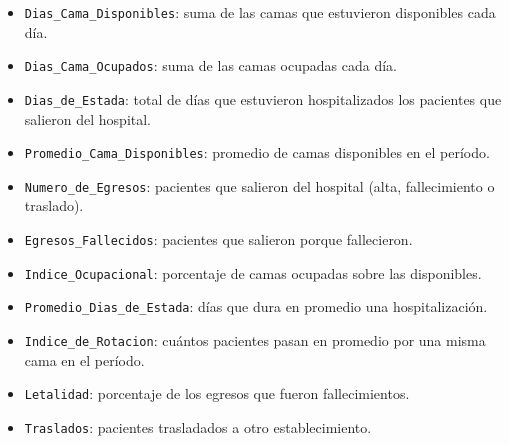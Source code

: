 \documentclass[10.5pt]{article}
\begin{document}
\begin{formulabox}
\begin{itemize}[leftmargin=1.1em,itemsep=2pt,topsep=2pt]
\item \texttt{Dias\_\allowbreak{}Cama\_\allowbreak{}Disponibles}: suma de las camas que estuvieron disponibles cada día.
\item \texttt{Dias\_\allowbreak{}Cama\_\allowbreak{}Ocupados}: suma de las camas ocupadas cada día.
\item \texttt{Dias\_\allowbreak{}de\_\allowbreak{}Estada}: total de días que estuvieron hospitalizados los pacientes que salieron del hospital.
\item \texttt{Promedio\_\allowbreak{}Cama\_\allowbreak{}Disponibles}: promedio de camas disponibles en el período.
\item \texttt{Numero\_\allowbreak{}de\_\allowbreak{}Egresos}: pacientes que salieron del hospital (alta, fallecimiento o traslado).
\item \texttt{Egresos\_\allowbreak{}Fallecidos}: pacientes que salieron porque fallecieron.
\item \texttt{Indice\_\allowbreak{}Ocupacional}: porcentaje de camas ocupadas sobre las disponibles.
\item \texttt{Promedio\_\allowbreak{}Dias\_\allowbreak{}de\_\allowbreak{}Estada}: días que dura en promedio una hospitalización.
\item \texttt{Indice\_\allowbreak{}de\_\allowbreak{}Rotacion}: cuántos pacientes pasan en promedio por una misma cama en el período.
\item \texttt{Letalidad}: porcentaje de los egresos que fueron fallecimientos.
\item \texttt{Traslados}: pacientes trasladados a otro establecimiento.
\end{itemize}
\end{formulabox}
\end{document}
